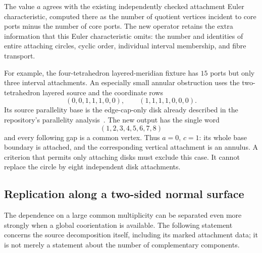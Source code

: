 The value $a$ agrees with the existing independently checked attachment
Euler characteristic, computed there as the number of quotient vertices
incident to core ports minus the number of core ports.  The new operator
retains the extra information that this Euler characteristic omits:
the number and identities of entire attaching circles, cyclic order,
individual interval membership, and fibre transport.

For example, the four-tetrahedron layered-meridian fixture has $15$ ports
but only three interval attachments.  An especially small annular
obstruction uses the two-tetrahedron layered source and the coordinate rows
\[
                (0,0,1,1,1,0,0),\qquad (1,1,1,1,0,0,0).
\]
Its source parallelity base is the edge-cap-only disk already described in
the repository's parallelity analysis~\cite{ProveIt2026}.  The new output
has the single word
\[
                         (1,2,3,4,5,6,7,8)
\]
and every following gap is a common vertex.  Thus $a=0$, $c=1$: its whole
base boundary is attached, and the corresponding vertical attachment is an
annulus.  A criterion that permits only attaching disks must exclude this
case.  It cannot replace the circle by eight independent disk attachments.

\subsection{Replication along a two-sided normal surface}
\label{int:replication}

The dependence on a large common multiplicity can be separated even more
strongly when a global coorientation is available.  The following statement
concerns the source decomposition itself, including its marked attachment
data; it is not merely a statement about the number of complementary
components.

